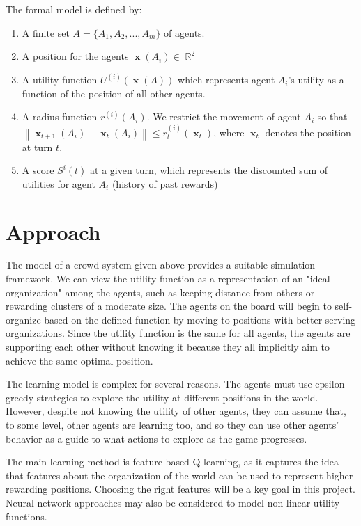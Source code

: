 \documentclass[10pt]{amsart}
\theoremstyle{definition}
\DeclareMathOperator{\R}{\mathbb{R}}
\DeclareMathOperator{\xx}{\mathbf{x}}
\begin{document}
The formal model is defined by:

\begin{enumerate}
\item A finite set $A = \{A_1, A_2, ..., A_m\}$ of agents.
\item A position for the agents $\xx(A_i) \in \R^2$
\item A utility function $U^{(i)}(\xx(A))$ which represents agent $A_i$'s utility as a function of the position of all other agents.
\item A radius function $r^{(i)}(A_i)$. We restrict the movement of agent $A_i$ so that $\left\|\xx_{t+1}(A_i) - \xx_{t}(A_i)\right\| \leq r_{t}^{(i)}(\xx_t)$, where $\xx_t$ denotes the position at turn $t$.
\item A score $S^{i}(t)$ at a given turn, which represents the discounted sum of utilities for agent $A_i$ (history of past rewards)
\end{enumerate}

\section{Approach}

The model of a crowd system given above provides a suitable simulation framework. We can view the utility function as a representation of an "ideal organization" among the agents, such as keeping distance from others or rewarding clusters of a moderate size. The agents on the board will begin to self-organize based on the defined function by moving to positions with better-serving organizations. Since the utility function is the same for all agents, the agents are supporting each other without knowing it because they all implicitly aim to achieve the same optimal position.

The learning model is complex for several reasons. The agents must use epsilon-greedy strategies to explore the utility at different positions in the world. However, despite not knowing the utility of other agents, they can assume that, to some level, other agents are learning too, and so they can use other agents' behavior as a guide to what actions to explore as the game progresses.

The main learning method is feature-based Q-learning, as it captures the idea that features about the organization of the world can be used to represent higher rewarding positions. Choosing the right features will be a key goal in this project. Neural network approaches may also be considered to model non-linear utility functions.
\end{document}
